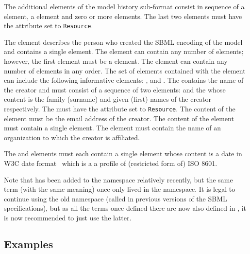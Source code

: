 The additional elements of the model history sub-format consist in
sequence of a  element, a
 element and zero or more
 elements.  The last two elements must have
the attribute  set to \texttt{Resource}.

The  element describes the person who created
the SBML encoding of the model and contains a single
 element.  The  element can contain
any number of elements; however, the first element must be a
 element.  The  element can contain
any number of elements in any order.  The set of elements
contained with the  element can include the
following informative elements: ,
 and .  The 
contains the name of the creator and must consist of a sequence of
two elements:  and the 
whose content is the family (surname) and given (first) names of
the creator respectively.  The  must have the
attribute  set to \texttt{Resource}.  The
content of the  element must be the email
address of the creator.  The content of the 
element must contain a single  element.  The
 element must contain the name of an
organization to which the creator is affiliated.

The  and  elements
must each contain a single  element whose
content is a date in W3C date format~\citep{wolf:1998} which is a
a profile of (restricted form of) ISO 8601.

\begin{blockChanged}
Note that  has been added to the  namespace relatively recently, but the same term (with the same meaning) once only lived in the  namespace.  It is legal to continue using the old namespace (called  in previous versions of the SBML specifications), but as all the terms once defined there are now also defined in , it is now recommended to just use the latter.
\end{blockChanged}


\subsection{Examples}

